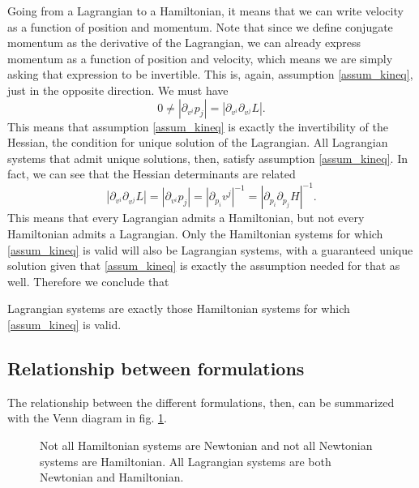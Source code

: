 Going from a Lagrangian to a Hamiltonian, it means that we can write velocity as a function of position and momentum. Note that since we define conjugate momentum as the derivative of the Lagrangian, we can already express momentum as a function of position and velocity, which means we are simply asking that expression to be invertible. This is, again, assumption \ref{assum_kineq}, just in the opposite direction. We must have
\begin{equation}
	0 \neq \left| \partial_{v^i} p_j \right| = \left| \partial_{v^i} \partial_{v^j} L \right|.
\end{equation}
This means that assumption \ref{assum_kineq} is exactly the invertibility of the Hessian, the condition for unique solution of the Lagrangian. All Lagrangian systems that admit unique solutions, then, satisfy assumption \ref{assum_kineq}. In fact, we can see that the Hessian determinants are related
\begin{equation}
	\left| \partial_{v^i} \partial_{v^j} L \right| = \left| \partial_{v^i} p_j \right| = \left| \partial_{p_i} v^j \right|^{-1} = \left|\partial_{p_i}\partial_{p_j} H\right|^{-1}.
\end{equation}
This means that every Lagrangian admits a Hamiltonian, but not every Hamiltonian admits a Lagrangian. Only the Hamiltonian systems for which \ref{assum_kineq} is valid will also be Lagrangian systems, with a guaranteed unique solution given that \ref{assum_kineq} is exactly the assumption needed for that as well. Therefore we conclude that
\begin{insight}
	Lagrangian systems are exactly those Hamiltonian systems for which \ref{assum_kineq} is valid.
\end{insight}

\subsection{Relationship between formulations}

The relationship between the different formulations, then, can be summarized with the Venn diagram in fig. \ref{rp-cm-fig-vennDiagramEarly}.

\begin{figure}[h]
	\centering
	\caption {Not all Hamiltonian systems are Newtonian and not all Newtonian systems are Hamiltonian. All Lagrangian systems are both Newtonian and Hamiltonian.}\label{rp-cm-fig-vennDiagramEarly}
\end{figure}



